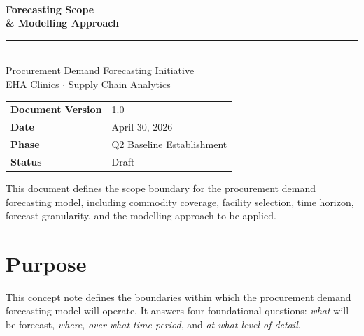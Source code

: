 \documentclass[12pt, a4paper]{article}
\begin{document}
\begin{titlepage}
  \pagecolor{ehaBlue}
  \color{white}
  \vspace*{2cm}

  {\fontsize{10}{12}\selectfont\MakeUppercase{}}\\[0.5em]
  {\fontsize{28}{34}\selectfont\bfseries Forecasting Scope\\[0.2em] \& Modelling Approach}\\[1.5em]
  \textcolor{ehaAccent}{\rule{6cm}{2pt}}\\[1.5em]

  {\large Procurement Demand Forecasting Initiative}\\[0.4em]
  {\normalsize EHA Clinics $\cdot$ Supply Chain Analytics}\\[3cm]

  \begin{tabular}{@{}ll}
    \textbf{Document Version} & 1.0 \\[0.4em]
    \textbf{Date}             & April 30, 2026 \\[0.4em]
    \textbf{Phase}            & Q2 Baseline Establishment \\[0.4em]
    \textbf{Status}           & Draft \\
  \end{tabular}

  \vfill
  {\small\textcolor{white!70!ehaBlue}%
    {This document defines the scope boundary for the procurement demand forecasting model,
     including commodity coverage, facility selection, time horizon, forecast granularity,
     and the modelling approach to be applied.}}
\end{titlepage}
\pagecolor{white}\color{black}

\newpage
\tableofcontents
\newpage

\section{Purpose}

This concept note defines the boundaries within which the procurement demand
forecasting model will operate. It answers four foundational questions:
\textit{what} will be forecast, \textit{where}, \textit{over what time period},
and \textit{at what level of detail}.
\end{document}

